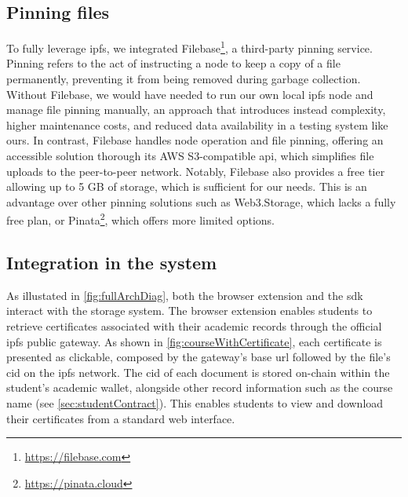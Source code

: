 \subsection{Pinning files}
To fully leverage \acrshort{ipfs}, we integrated Filebase\footnote{\url{https://filebase.com}}, a third-party pinning service. Pinning refers to the act of instructing a node to keep a copy of a file permanently, preventing it from being removed during garbage collection. Without Filebase, we would have needed to run our own local \acrshort{ipfs} node and manage file pinning manually, an approach that introduces instead complexity, higher maintenance costs, and reduced data availability in a testing system like ours. In contrast, Filebase handles node operation and file pinning, offering an accessible solution thorough its AWS S3-compatible \acrshort{api}, which simplifies file uploads to the peer-to-peer network. Notably, Filebase also provides a free tier allowing up to 5 GB of storage, which is sufficient for our needs. This is an advantage over other pinning solutions such as Web3.Storage, which lacks a fully free plan, or Pinata\footnote{\url{https://pinata.cloud}}, which offers more limited options.

\subsection{Integration in the system}
As illustated in \cref{fig:fullArchDiag}, both the browser extension and the \acrshort{sdk} interact with the storage system. The browser extension enables students to retrieve certificates associated with their academic records through the official \acrshort{ipfs} public gateway. As shown in \cref{fig:courseWithCertificate}, each certificate is presented as clickable, composed by the gateway's base \acrshort{url} followed by the file's \acrfull{cid} on the \acrshort{ipfs} network. The \acrshort{cid} of each document is stored on-chain within the student's academic wallet, alongside other record information such as the course name (see \cref{sec:studentContract}). This enables students to view and download their certificates from a standard web interface.

